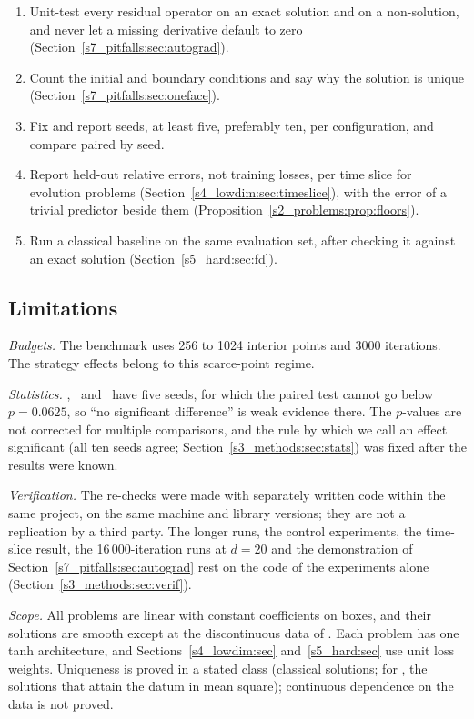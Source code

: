 \begin{enumerate}[label=\arabic*.,leftmargin=*]
\item Unit-test every residual operator on an exact solution and on a non-solution, and never
let a missing derivative default to zero (Section~\ref{s7_pitfalls:sec:autograd}).
\item Count the initial and boundary conditions and say why the solution is unique
(Section~\ref{s7_pitfalls:sec:oneface}).
\item Fix and report seeds, at least five, preferably ten, per configuration, and compare
paired by seed.
\item Report held-out relative errors, not training losses, per time slice for evolution
problems (Section~\ref{s4_lowdim:sec:timeslice}), with the error of a trivial predictor beside
them (Proposition~\ref{s2_problems:prop:floors}).
\item Run a classical baseline on the same evaluation set, after checking it against an
exact solution (Section~\ref{s5_hard:sec:fd}).
\end{enumerate}

\subsection{Limitations}\label{s8_discussion:sec:limitations}

\emph{Budgets.} The benchmark uses 256 to 1024 interior points and 3000 iterations. The
strategy effects belong to this scarce-point regime.

\emph{Statistics.} \PWone, \PWtwo\ and \PLthree\ have five seeds, for which the paired
test cannot go below $p=0.0625$, so ``no significant difference'' is weak evidence there.
The $p$-values are not corrected for multiple comparisons, and the rule by which we call
an effect significant (all ten seeds agree; Section~\ref{s3_methods:sec:stats}) was fixed
after the results were known.

\emph{Verification.} The re-checks were made with separately written code within the same
project, on the same machine and library versions; they are not a replication by a third
party. The longer runs, the control experiments, the time-slice result, the 16\,000-iteration
runs at $d=20$ and the demonstration of Section~\ref{s7_pitfalls:sec:autograd} rest on the code of
the experiments alone (Section~\ref{s3_methods:sec:verif}).

\emph{Scope.} All problems are linear with constant coefficients on boxes, and their
solutions are smooth except at the discontinuous data of \PLthree. Each problem has one
tanh architecture, and Sections~\ref{s4_lowdim:sec} and~\ref{s5_hard:sec} use unit loss
weights. Uniqueness is proved in a stated class (classical solutions; for \PLthree, the
solutions that attain the datum in mean square); continuous dependence on the data is not
proved.

